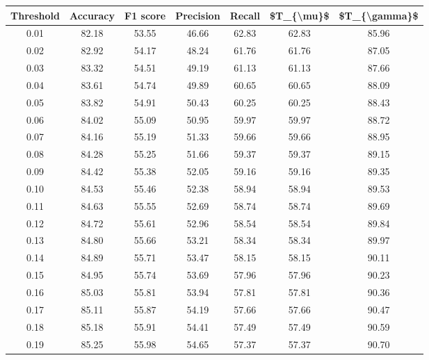 \begin{tabular}{|c|c|c|c|c|c|c|}
\hline
 Threshold &  Accuracy &  F1 score &  Precision &  Recall &  \$T\_\{\textbackslash mu\}\$ &  \$T\_\{\textbackslash gamma\}\$ \\
\hline
      0.01 &     82.18 &     53.55 &      46.66 &   62.83 &      62.83 &         85.96 \\
      0.02 &     82.92 &     54.17 &      48.24 &   61.76 &      61.76 &         87.05 \\
      0.03 &     83.32 &     54.51 &      49.19 &   61.13 &      61.13 &         87.66 \\
      0.04 &     83.61 &     54.74 &      49.89 &   60.65 &      60.65 &         88.09 \\
      0.05 &     83.82 &     54.91 &      50.43 &   60.25 &      60.25 &         88.43 \\
      0.06 &     84.02 &     55.09 &      50.95 &   59.97 &      59.97 &         88.72 \\
      0.07 &     84.16 &     55.19 &      51.33 &   59.66 &      59.66 &         88.95 \\
      0.08 &     84.28 &     55.25 &      51.66 &   59.37 &      59.37 &         89.15 \\
      0.09 &     84.42 &     55.38 &      52.05 &   59.16 &      59.16 &         89.35 \\
      0.10 &     84.53 &     55.46 &      52.38 &   58.94 &      58.94 &         89.53 \\
      0.11 &     84.63 &     55.55 &      52.69 &   58.74 &      58.74 &         89.69 \\
      0.12 &     84.72 &     55.61 &      52.96 &   58.54 &      58.54 &         89.84 \\
      0.13 &     84.80 &     55.66 &      53.21 &   58.34 &      58.34 &         89.97 \\
      0.14 &     84.89 &     55.71 &      53.47 &   58.15 &      58.15 &         90.11 \\
      0.15 &     84.95 &     55.74 &      53.69 &   57.96 &      57.96 &         90.23 \\
      0.16 &     85.03 &     55.81 &      53.94 &   57.81 &      57.81 &         90.36 \\
      0.17 &     85.11 &     55.87 &      54.19 &   57.66 &      57.66 &         90.47 \\
      0.18 &     85.18 &     55.91 &      54.41 &   57.49 &      57.49 &         90.59 \\
      0.19 &     85.25 &     55.98 &      54.65 &   57.37 &      57.37 &         90.70 \\

\end{tabular}
